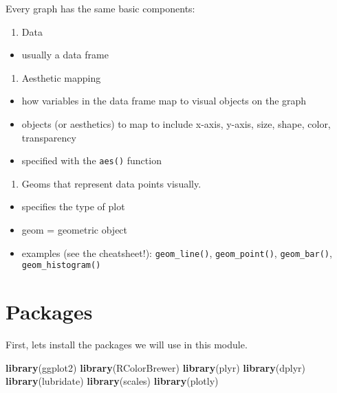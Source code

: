 \documentclass[oneside]{memoir}
\newenvironment{Shaded}{\begin{snugshade}}{\end{snugshade}}
\newcommand{\KeywordTok}[1]{\textcolor[rgb]{0.13,0.29,0.53}{\textbf{#1}}}
\newcommand{\NormalTok}[1]{#1}
\providecommand{\tightlist}{%
  \setlength{\itemsep}{0pt}\setlength{\parskip}{0pt}}
\theoremstyle{definition}
\theoremstyle{definition}
\theoremstyle{definition}
\theoremstyle{remark}
\begin{document}
Every graph has the same basic components:

\begin{enumerate}
\def\labelenumi{\arabic{enumi}.}
\tightlist
\item
  Data
\end{enumerate}

\begin{itemize}
\tightlist
\item
  usually a data frame
\end{itemize}

\begin{enumerate}
\def\labelenumi{\arabic{enumi}.}
\setcounter{enumi}{1}
\tightlist
\item
  Aesthetic mapping
\end{enumerate}

\begin{itemize}
\tightlist
\item
  how variables in the data frame map to visual objects on the graph
\item
  objects (or aesthetics) to map to include x-axis, y-axis, size, shape,
  color, transparency
\item
  specified with the \texttt{aes()} function
\end{itemize}

\begin{enumerate}
\def\labelenumi{\arabic{enumi}.}
\setcounter{enumi}{2}
\tightlist
\item
  Geoms that represent data points visually.\\
\end{enumerate}

\begin{itemize}
\tightlist
\item
  specifies the type of plot
\item
  geom = geometric object
\item
  examples (see the cheatsheet!): \texttt{geom\_line()},
  \texttt{geom\_point()}, \texttt{geom\_bar()},
  \texttt{geom\_histogram()}
\end{itemize}

\section{Packages}\label{packages}

First, lets install the packages we will use in this module.

\begin{Shaded}
\begin{Highlighting}[]
\KeywordTok{library}\NormalTok{(ggplot2)}
\KeywordTok{library}\NormalTok{(RColorBrewer)}
\KeywordTok{library}\NormalTok{(plyr)}
\KeywordTok{library}\NormalTok{(dplyr)}
\KeywordTok{library}\NormalTok{(lubridate)}
\KeywordTok{library}\NormalTok{(scales)}
\KeywordTok{library}\NormalTok{(plotly)}
\end{Highlighting}
\end{Shaded}
\end{document}
